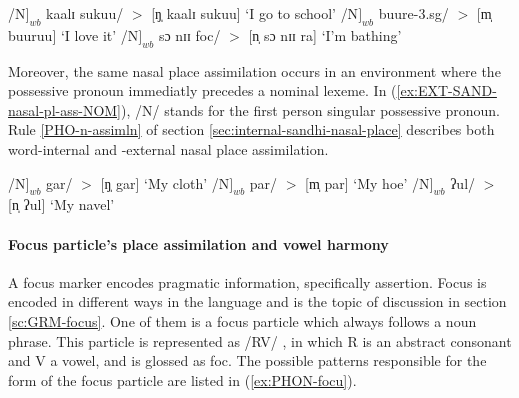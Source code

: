 \begin{exe}
\ex\label{ex:EXT-SAND-nasal-pl-ass-VERB} 
\begin{xlist}
 \ex\label{ex:EXT-SAND-N} 
/N$]_{wb}$ kaalɪ sukuu/ $>$ [ŋ̩ kaalɪ sukuu] `I go to school'
 \ex\label{ex:EXT-SAND-m} 
/N$]_{wb}$ buure-{\sc 3.sg}/   $>$  [m̩ buuruu] `I love it'
 \ex\label{ex:EXT-SAND-n} 
/N$]_{wb}$ sɔ nɪɪ {\sc foc}/   $>$  [n̩ sɔ  nɪɪ ra] `I'm bathing' 
\end{xlist}
\end{exe}

Moreover,  the same nasal place assimilation occurs in an environment where the
possessive pronoun  immediatly precedes a nominal lexeme. In
(\ref{ex:EXT-SAND-nasal-pl-ass-NOM}),  /N/  stands for the  first person
singular
possessive pronoun. Rule \ref{PHO-n-assimln} of section
\ref{sec:internal-sandhi-nasal-place}  describes both word-internal and
 -external nasal place assimilation.

\begin{exe}
\ex\label{ex:EXT-SAND-nasal-pl-ass-NOM} 
\begin{xlist}
 \ex\label{ex:EXT-SAND-N} 
/N$]_{wb}$ gar/ $>$ [ŋ̩ gar] `My cloth'
 \ex\label{ex:EXT-SAND-m} 
/N$]_{wb}$ par/ $>$ [m̩ par] `My hoe'
 \ex\label{ex:EXT-SAND-n} 
/N$]_{wb}$ ʔul/ $>$ [n̩ ʔul] `My navel'
\end{xlist}
\end{exe}



\paragraph{Focus particle's place assimilation and vowel harmony}
\label{sec:focus-forms}

A focus marker encodes pragmatic information, specifically assertion. Focus is
encoded in different ways in the language and is the topic of discussion in
section \ref{sc:GRM-focus}. One of them is a  focus particle which always
follows a noun phrase. This particle is represented as /RV/ , in which R is an
abstract consonant and V a vowel, and  is glossed as {\sc foc}. The possible
patterns
responsible for the form of the focus particle are listed in
(\ref{ex:PHON-focu}).

